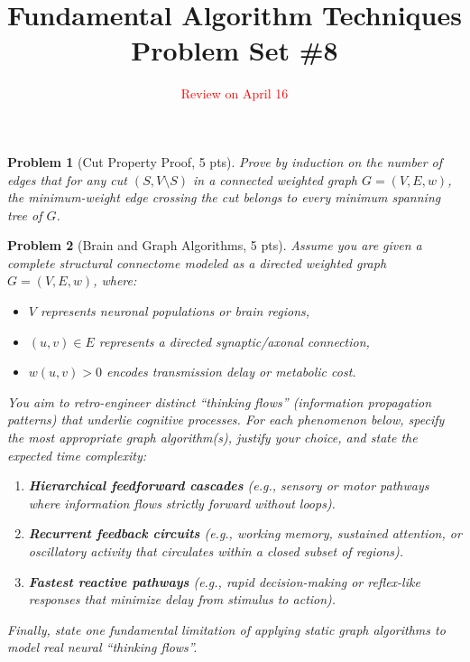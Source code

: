 \documentclass[11pt]{article}
\title{\textbf{Fundamental Algorithm Techniques} \\ Problem Set \#8}
\date{\textcolor{red}{Review on April 16}}
\newtheorem{problem}{Problem}
\begin{document}
\maketitle


\begin{problem}[Cut Property Proof, 5 pts]
Prove by induction on the number of edges that for any cut $(S, V \setminus S)$ in a connected weighted graph $G = (V, E, w)$, the minimum-weight edge crossing the cut belongs to every minimum spanning tree of $G$.
\end{problem}


\begin{problem}[Brain and Graph Algorithms, 5 pts]
Assume you are given a complete structural connectome modeled as a directed weighted graph $G = (V, E, w)$, where:
\begin{itemize}
    \item $V$ represents neuronal populations or brain regions,
    \item $(u, v) \in E$ represents a directed synaptic/axonal connection,
    \item $w(u, v) > 0$ encodes transmission delay or metabolic cost.
\end{itemize}
You aim to retro-engineer distinct ``thinking flows'' (information propagation patterns) that underlie cognitive processes. For each phenomenon below, specify the most appropriate graph algorithm(s), justify your choice, and state the expected time complexity:
\begin{enumerate}
    \item[(a)] \textbf{Hierarchical feedforward cascades} (e.g., sensory or motor pathways where information flows strictly forward without loops).
    \item[(b)] \textbf{Recurrent feedback circuits} (e.g., working memory, sustained attention, or oscillatory activity that circulates within a closed subset of regions).
    \item[(c)] \textbf{Fastest reactive pathways} (e.g., rapid decision-making or reflex-like responses that minimize delay from stimulus to action).
\end{enumerate}
Finally, state one fundamental limitation of applying static graph algorithms to model real neural ``thinking flows''.
\end{problem}
\end{document}
